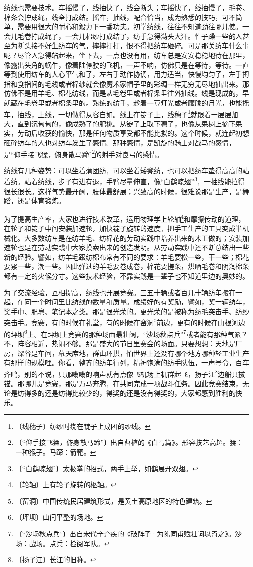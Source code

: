 \documentclass[12pt,UTF-8,openany]{ctexbook}
\begin{document}
\begin{normalsize}
    纺线也需要技术。车摇慢了，线抽快了，线会断头；车摇快了，线抽慢了，毛卷、棉条会拧成绳，线全打成结。摇车，抽线，配合恰当，成为熟悉的技巧，可不简单，需要用很大的耐心和毅力下一番功夫。初学纺线，往往不知道劲往哪儿使。一会儿毛卷拧成绳了，一会儿棉纱打成结了，纺手急得满头大汗。性子躁一些的人甚至为断头接不好生纺车的气，摔摔打打，恨不得把纺车砸碎。可是那关纺车什么事呢？尽管人急得站起来，坐下去，一点也没有用，纺车总是安安稳稳地待在那里，像露出头角的蜗牛，像着陆停驶的飞机，一声不响，仿佛只是在等待，等待。一直等到使用纺车的人心平气和了，左右手动作协调，用力适当，快慢均匀了，左手拇指和食指间的毛线或者棉纱就会像魔术家帽子里的彩绸一样无穷无尽地抽出来。那仿佛不是用羊毛、棉花纺线，而是从毛卷里或者棉条里往外抽线。线是现成的，早就藏在毛卷里或者棉条里的。熟练的纺手，趁着一豆灯光或者朦胧的月光，也能摇车，抽线，上线，一切做得从容自如。线上在锭子上，线穗子\footnote{〔线穗子〕纺纱时绕在锭子上成团的纱线。}就跟着一层层加大，直到沉甸甸的，像成熟了的肥桃。从锭子上取下穗子，也像从果树上摘下果实，劳动后收获的愉快，那是任何物质享受都不能比拟的。这个时候，就连起初想砸碎纺车的人也对纺车发生了感情。那种感情，是凯旋的骑士对战马的感情，是“仰手接飞猱，俯身散马蹄”\footnote{〔“仰手接飞猱，俯身散马蹄”〕出自曹植的《白马篇》。形容技艺高超。猱：一种猴子。马蹄：箭靶。}的射手对良弓的感情。
    
    纺线有几种姿势：可以坐着蒲团纺，可以坐着矮凳纺，也可以把纺车垫得高高的站着纺。站着纺线，步子有进有退，手臂尽量伸直，像“白鹤晾翅”\footnote{〔“白鹤晾翅”〕太极拳的招式，两手上举，如鹤展开双翅。}，一抽线能拉得很长很长。这样气势最开阔，肢体最舒展；兴致高的时候，很难说那是生产，是舞蹈，还是体育锻炼。
    
    为了提高生产率，大家也进行技术改革，运用物理学上轮轴\footnote{〔轮轴〕上有轮子旋转的枢轴。}和摩擦传动的道理，在轮子和锭子中间安装加速轮，加快锭子旋转的速度，把手工生产的工具变成半机械化。大多数纺车是在纺羊毛、纺棉花的劳动实践中培养出来的木工做的；安装加速轮也是在劳动实践中大家摸索出来的创造发明。从劳动实践中还不断总结出一些新的经验。譬如，纺羊毛跟纺棉布常有不同的要求：羊毛要松一些，干一些；棉花要紧一些，潮一些。因此弹过的羊毛要卷成卷，棉花要搓条，烘晒毛卷和阴润棉条都有一定的火候分寸。这些技术经验，不靠实践是一辈子也不知道里边的奥妙的。
    
    为了交流经验，互相提高，纺线也开展竞赛。三五十辆或者百几十辆纺车搬在一起，在同一个时间里比纺线的数量和质量。成绩好的有奖励，譬如，奖一辆纺车，奖手巾、肥皂、笔记本之类。那是很光荣的。更光荣的是被称为纺毛突击手、纺纱突击手。竞赛，有的时候在礼堂，有的时候在窑洞\footnote{〔窑洞〕中国传统民居建筑形式，是黄土高原地区的特色建筑。}前边，更有的时候在山根河边的坪坝\footnote{〔坪坝〕山间平整的场地。}上。在坪坝上竞赛的那种场面最壮阔，“沙场秋点兵”\footnote{〔“沙场秋点兵”〕出自宋代辛弃疾的《破阵子·为陈同甫赋壮词以寄之》。沙场：战场。点兵：检阅军队。}或者能有那种气派？不，阵容相近，热闹不够。那是盛大的节日里赛会的场面。只要想想：天地是厂房，深谷是车间，幕天席地，群山环拱，怕世界上还没有哪个地方哪种轻工业生产有那样的规模哩。你看，整齐的纺车行列，精神饱满的纺手队伍，一声号令，百车齐鸣，别的不说，只那嗡嗡的响声就有点像飞机场上机群起飞，扬子江\footnote{〔扬子江〕长江的旧称。}边船只拔锚。那哪儿是竞赛，那是万马奔腾，在共同完成一项战斗任务。因此竞赛结束，无论是纺得多的还是纺得比较少的，得奖的还是没有得奖的，大家都感到胜利的快乐。
    

\end{normalsize}
\end{document}
